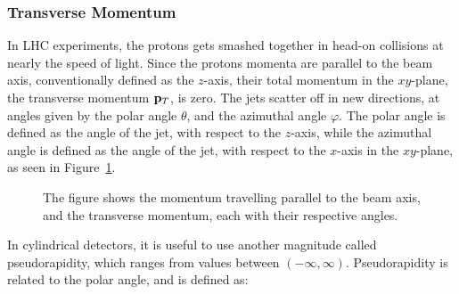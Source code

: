 \documentclass[12pt,a4paper]{article}
\numberwithin{equation}{section}
\begin{document}
\subsubsection{Transverse Momentum}\label{sec:transmomentum}
In LHC experiments, the protons gets smashed together in head-on collisions at
nearly the speed of light. Since the protons momenta are parallel to the beam
axis, conventionally defined as the $z$-axis, their total momentum in the
$xy$-plane, the transverse momentum $\vb p_T$, is zero. The jets scatter off in
new directions, at angles given by the polar angle $\theta$, and the azimuthal angle
$\varphi$. The polar angle is defined as the angle of the jet, with respect to the
$z$-axis, while the azimuthal angle is defined as the angle of the jet, with
respect to the $x$-axis in the $xy$-plane, as seen in Figure~\ref{fig:momentum}.

\begin{figure}[H]
  \centering
  \caption{The figure shows the momentum travelling parallel to the beam axis, and
  the transverse momentum, each with their respective angles.\label{fig:momentum}}
\end{figure}

In cylindrical detectors, it is useful to use another magnitude called
pseudorapidity, which ranges from values between $(-\infty, \infty)$. Pseudorapidity is
related to the polar angle, and is defined as:
\end{document}
